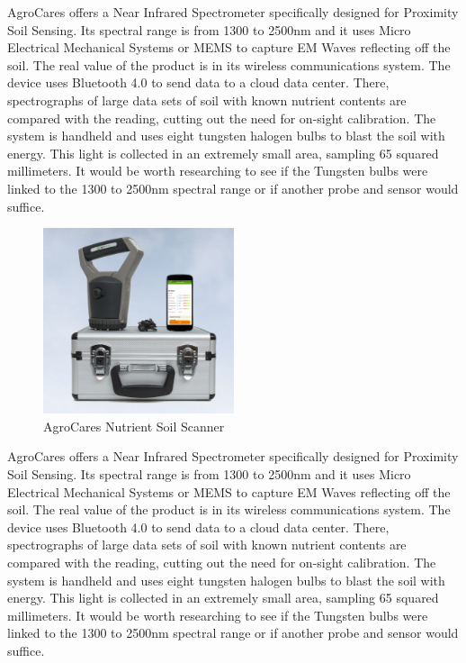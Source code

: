 AgroCares offers a Near Infrared Spectrometer specifically designed for Proximity Soil Sensing. Its spectral range is from 1300 to 2500nm and it uses Micro Electrical Mechanical Systems or MEMS to capture EM Waves reflecting off the soil. The real value of the product is in its wireless communications system. The device uses Bluetooth 4.0 to send data to a cloud data center. There, spectrographs of large data sets of soil with known nutrient contents are compared with the reading, cutting out the need for on-sight calibration. The system is handheld and uses eight tungsten halogen bulbs to blast the soil with energy. This light is collected in an extremely small area, sampling 65 squared millimeters. It would be worth researching to see if the Tungsten bulbs were linked to the 1300 to 2500nm spectral range or if another probe and sensor would suffice.
\begin{figure}[H]
    \caption{AgroCares Nutrient Soil Scanner}
    \centering
    \includegraphics[width=0.5\textwidth]{images/3-2-2Pic.png}
\end{figure}

AgroCares offers a Near Infrared Spectrometer specifically designed for Proximity Soil Sensing. Its spectral range is from 1300 to 2500nm and it uses Micro Electrical Mechanical Systems or MEMS to capture EM Waves reflecting off the soil. The real value of the product is in its wireless communications system. The device uses Bluetooth 4.0 to send data to a cloud data center. There, spectrographs of large data sets of soil with known nutrient contents are compared with the reading, cutting out the need for on-sight calibration. The system is handheld and uses eight tungsten halogen bulbs to blast the soil with energy. This light is collected in an extremely small area, sampling 65 squared millimeters. It would be worth researching to see if the Tungsten bulbs were linked to the 1300 to 2500nm spectral range or if another probe and sensor would suffice.


